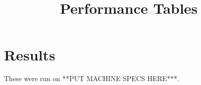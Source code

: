 \documentclass{aastex63}
\begin{document}
\title{Performance Tables}
\section{Results}

These were run on **PUT MACHINE SPECS HERE***.




\end{document}
